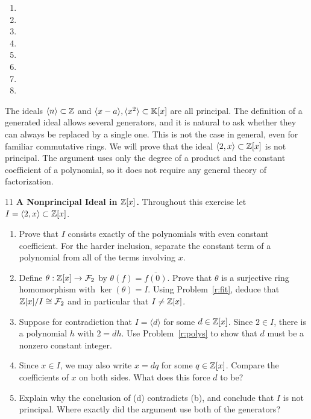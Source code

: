 \documentclass[Notebook.tex]{subfiles}
\begin{document}
\begin{solution}
	\bbni
	\begin{enumerate}[label=(\alph*),ref=\theenumi\alph*]
		\item
		\item
		\item
		\item
		\item
		\item
		\item
		\item
	\end{enumerate}
\end{solution}

\newpage

The ideals $\langle n\rangle\subset\mathbb Z$ and $\langle x-a\rangle,\langle x^2\rangle\subset\mathbb K[x]$ are all principal. The definition of a generated ideal allows several generators, and it is natural to ask whether they can always be replaced by a single one. This is not the case in general, even for familiar commutative rings. We will prove that the ideal $\langle 2,x\rangle\subset\mathbb Z[x]$ is not principal. The argument uses only the degree of a product and the constant coefficient of a polynomial, so it does not require any general theory of factorization.

\hrulefill

\begin{problem}{11}\label{r:nonprincipal}
	\textbf{A Nonprincipal Ideal in $\mathbb Z[x]$.} Throughout this exercise let $I=\langle 2,x\rangle\subset\mathbb Z[x]$.
	\begin{enumerate}[label=(\alph*),ref=\theenumi\alph*]
		\item Prove that $I$ consists exactly of the polynomials with even constant coefficient. For the harder inclusion, separate the constant term of a polynomial from all of the terms involving $x$.
		\item Define $\theta:\mathbb Z[x]\to\mathcal{F}_2$ by $\theta(f)=\overline{f(0)}$. Prove that $\theta$ is a surjective ring homomorphism with $\ker(\theta)=I$. Using Problem~\ref{r:fit}, deduce that $\mathbb Z[x]/I\cong\mathcal{F}_2$ and in particular that $I\ne\mathbb Z[x]$.
		\item Suppose for contradiction that $I=\langle d\rangle$ for some $d\in\mathbb Z[x]$. Since $2\in I$, there is a polynomial $h$ with $2=dh$. Use Problem~\ref{r:polys} to show that $d$ must be a nonzero constant integer.
		\item Since $x\in I$, we may also write $x=dq$ for some $q\in\mathbb Z[x]$. Compare the coefficients of $x$ on both sides. What does this force $d$ to be?
		\item Explain why the conclusion of (d) contradicts (b), and conclude that $I$ is not principal. Where exactly did the argument use both of the generators?
	\end{enumerate}
\end{problem}
\end{document}
